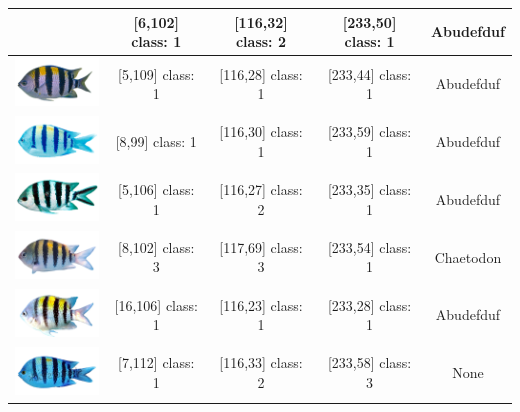 \begin{longtable}{|c|c|c|c|c|}
	& [6,102] class: 1 & [116,32] class: 2 & [233,50] class: 1 & Abudefduf \\
	\hline
	\includegraphics[width=3cm]{gambar/dataset_validasi/Abudefduf18}
	& [5,109] class: 1 & [116,28] class: 1 & [233,44] class: 1 & Abudefduf \\
	\hline
	\includegraphics[width=3cm]{gambar/dataset_validasi/Abudefduf19}
	& [8,99] class: 1 & [116,30] class: 1 & [233,59] class: 1 & Abudefduf \\
	\hline
	\includegraphics[width=3cm]{gambar/dataset_validasi/Abudefduf20}
	& [5,106] class: 1 & [116,27] class: 2 & [233,35] class: 1 & Abudefduf \\
	\hline
	\includegraphics[width=3cm]{gambar/dataset_validasi/Abudefduf21}
	& [8,102] class: 3 & [117,69] class: 3 & [233,54] class: 1 & Chaetodon \\
	\hline
	\includegraphics[width=3cm]{gambar/dataset_validasi/Abudefduf22}
	& [16,106] class: 1 & [116,23] class: 1 & [233,28] class: 1 & Abudefduf \\
	\hline
	\includegraphics[width=3cm]{gambar/dataset_validasi/Abudefduf23}
	& [7,112] class: 1 & [116,33] class: 2 & [233,58] class: 3 & None \\

\end{longtable}
